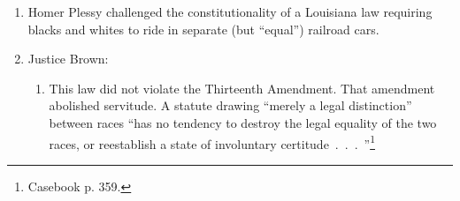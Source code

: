\begin{enumerate}
    \item Homer Plessy challenged the constitutionality of a Louisiana law 
    requiring blacks and whites to ride in separate (but ``equal'') railroad 
    cars.
    \item Justice Brown:
    \begin{enumerate}
        \item This law did not violate the Thirteenth Amendment. That 
        amendment abolished servitude. A statute drawing ``merely a legal 
        distinction'' between races ``has no tendency to destroy the legal 
        equality of the two races, or reestablish a state of involuntary 
        certitude~.~.~.~''\footnote{Casebook p. 359.}
    \end{enumerate}
\end{enumerate}
%
% 
% 
% 
% 
% 
% 
% 
% 
